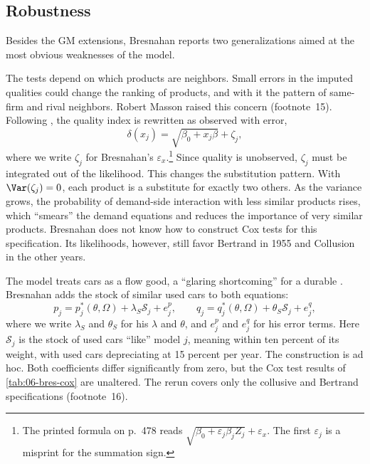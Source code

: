 \subsection{Robustness}\label{sec:06-bres-robust}

Besides the GM extensions, Bresnahan reports two generalizations aimed at the most obvious weaknesses of the model.

The tests depend on which products are neighbors. Small errors in the imputed qualities could change the ranking of
products, and with it the pattern of same-firm and rival neighbors. Robert Masson raised this concern (footnote~15).
Following \citet{Bresnahan1981}, the quality index is rewritten as observed with error,
\begin{equation}\label{eq:06-bres-qerror}
  \delta(x_j) = \sqrt{\beta_0 + x_j\beta} + \zeta_j,
\end{equation}
where we write $\zeta_j$ for Bresnahan's $\varepsilon_x$.\footnote{The printed formula on p.~478 reads
$\sqrt{\beta_0 + \varepsilon_j\beta_jZ_j} + \varepsilon_x$. The first $\varepsilon_j$ is a misprint for the summation sign.}
Since quality is unobserved, $\zeta_j$ must be integrated out of the likelihood. This changes the substitution
pattern. With $\Var(\zeta_j) = 0$, each product is a substitute for exactly two others. As the variance grows, the
probability of demand-side interaction with less similar products rises, which ``smears'' the demand equations and
reduces the importance of very similar products. Bresnahan does not know how to construct Cox tests for this
specification. Its likelihoods, however, still favor Bertrand in 1955 and Collusion in the other years.

The model treats cars as a flow good, a ``glaring shortcoming'' for a durable \citep[p.~478]{Bresnahan1987}.
Bresnahan adds the stock of similar used cars to both equations:
\begin{equation}\label{eq:06-bres-durable}
  p_j = p_j^*(\theta,\Omega) + \lambda_S \mathcal{S}_j + e^p_j,
  \qquad
  q_j = q_j^*(\theta,\Omega) + \theta_S \mathcal{S}_j + e^q_j,
\end{equation}
where we write $\lambda_S$ and $\theta_S$ for his $\lambda$ and $\theta$, and $e^p_j$ and $e^q_j$ for his error terms.
Here $\mathcal{S}_j$ is the stock of used cars ``like'' model $j$, meaning within ten percent of its weight, with used cars
depreciating at 15 percent per year. The construction is ad hoc. Both coefficients differ significantly from zero,
but the Cox test results of \cref{tab:06-bres-cox} are unaltered. The rerun covers only the collusive and Bertrand
specifications (footnote~16).

